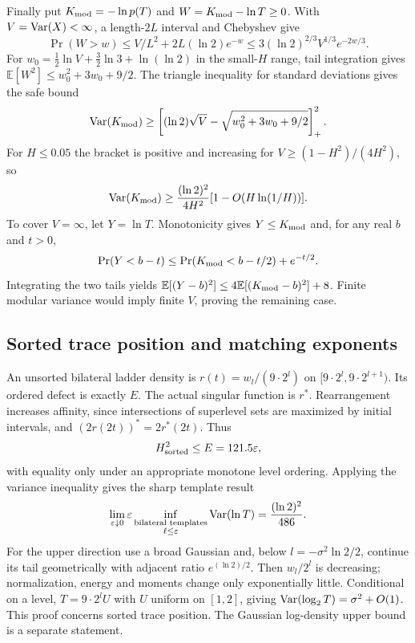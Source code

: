 Finally put $K_{\rm mod}=-\ln p(T)$ and $W=K_{\rm mod}-\ln T\ge0$. With $V=\operatorname{Var}(X)<\infty$, a length-$2L$ interval and Chebyshev give
\[
 \Pr(W>w)\le V/L^2+2L(\ln2)e^{-w}
 \le3(\ln2)^{2/3}V^{1/3}e^{-2w/3}.
\]
For $w_0=\tfrac12\ln V+\tfrac32\ln3+\ln(\ln2)$ in the small-$H$ range, tail integration gives $\mathbb E[W^2]\le w_0^2+3w_0+9/2$. The triangle inequality for standard deviations gives the safe bound
\[
 \operatorname{Var}(K_{\rm mod})\ge
 \left[(\ln2)\sqrt V-\sqrt{w_0^2+3w_0+9/2}\right]_+^2.
\]
For $H\le0.05$ the bracket is positive and increasing for $V\ge(1-H^2)/(4H^2)$, so
\[
 \operatorname{Var}(K_{\rm mod})\ge\frac{(\ln2)^2}{4H^2}
                    [1-O(H\ln(1/H))].
\]
To cover $V=\infty$, let $Y=\ln T$. Monotonicity gives $Y\le K_{\rm mod}$ and, for any real $b$ and $t>0$,
\[
 \Pr(Y<b-t)\le\Pr(K_{\rm mod}<b-t/2)+e^{-t/2}.
\]
Integrating the two tails yields $\mathbb E[(Y-b)^2]\le4\mathbb E[(K_{\rm mod}-b)^2]+8$. Finite modular variance would imply finite $V$, proving the remaining case.

\subsection{Sorted trace position and matching exponents}
An unsorted bilateral ladder density is $r(t)=w_l/(9\cdot2^l)$ on $[9\cdot2^l,9\cdot2^{l+1})$. Its ordered defect is exactly $E$. The actual singular function is $r^*$. Rearrangement increases affinity, since intersections of superlevel sets are maximized by initial intervals, and $(2r(2t))^*=2r^*(2t)$. Thus
\[
 H_{\rm sorted}^2\le E=121.5\varepsilon,
\]
with equality only under an appropriate monotone level ordering. Applying the variance inequality gives the sharp template result
\[
 \lim_{\varepsilon\downarrow0}\varepsilon\inf_{\substack{\text{bilateral templates}\\\ell\le\varepsilon}}\operatorname{Var}(\ln T)
       =\frac{(\ln2)^2}{486}.
\]
For the upper direction use a broad Gaussian and, below $l=-\sigma^2\ln2/2$, continue its tail geometrically with adjacent ratio $e^{(\ln2)/2}$. Then $w_l/2^l$ is decreasing; normalization, energy and moments change only exponentially little. Conditional on a level, $T=9\cdot2^lU$ with $U$ uniform on $[1,2]$, giving $\operatorname{Var}(\log_2T)=\sigma^2+O(1)$. This proof concerns sorted trace position. The Gaussian log-density upper bound is a separate statement.

